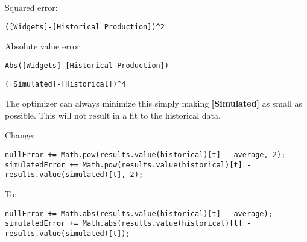 \documentclass[]{memoir}
\newcommand{\p}[1]{\textbf{{[}#1{]}}}
\begin{document}

Squared error:

\lstinline!([Widgets]-[Historical Production])^2!

Absolute value error:

\lstinline!Abs([Widgets]-[Historical Production])!


\lstinline!([Simulated]-[Historical])^4!


The optimizer can always minimize this simply making \p{Simulated} as
small as possible. This will not result in a fit to the historical data.


Change:

\begin{lstlisting}
nullError += Math.pow(results.value(historical)[t] - average, 2);
simulatedError += Math.pow(results.value(historical)[t] - results.value(simulated)[t], 2);
\end{lstlisting}

To:

\begin{lstlisting}
nullError += Math.abs(results.value(historical)[t] - average);
simulatedError += Math.abs(results.value(historical)[t] - results.value(simulated)[t]);
\end{lstlisting}

\end{document}
